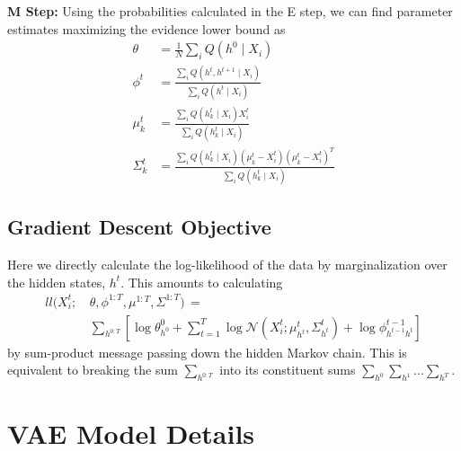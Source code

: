 \documentclass{edm_template}
\begin{document}
\textbf{M Step:}
Using the probabilities calculated in the E step, we can find parameter estimates maximizing the evidence lower bound as 
\begin{align*}
\theta &= \frac{1}{N} \sum_i Q(h^0 \mid X_i) \\
\phi^t &= \frac{\sum_i Q(h^t, h^{t+1} \mid X_i)} {\sum_i Q(h^t \mid X_i)}\\
\mu_k^t &= \frac{\sum_i Q(h^t_k \mid X_i) X_i^t} {\sum_i Q(h_k^t \mid X_i)}\\
\Sigma^t_k &= \frac{\sum_i Q(h^t_k \mid X_i) (\mu_k^t - X_i^t)(\mu_k^t - X_i^t)^T} {\sum_i Q(h_k^t \mid X_i)}
\end{align*}

\subsection{Gradient Descent Objective}

Here we directly calculate the log-likelihood of the data by marginalization over the hidden states, $h^t$. This amounts to calculating
\begin{align*}
ll(X_i^t ; \, &\theta,\phi^{1:T},\mu^{1:T},\Sigma^{1:T}) \, = \\
& \sum_{h^{0:T}} \left[ \log \theta_{h^0}^0 + \sum_{t=1}^T \log \mathcal{N}(X^t_i;\mu_{h^t}^t,\Sigma_{h^t}^t) + \log 
\phi_{h^{t-1}h^t}^{t-1} \right]
\end{align*}
by sum-product message passing down the hidden Markov chain. This is equivalent to breaking the sum $\sum_{h^{0:T}}$ into its constituent sums $\sum_{h^0} \sum_{h^{1}} ... \sum_{h^T}$. 

\section{VAE Model Details}
\label{app:VAE_details}
\end{document}

